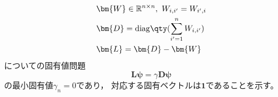 \documentclass[class=jsarticle, crop=false, dvipdfmx, fleqn]{standalone}
\begin{document}
\section{}

\begin{align}
    & \bm{W} \in \mathbb{R}^{n \times n},\ W_{i, i'} = W_{i', i}
    \label{eq:W} \\
    & \bm{D} = \mathrm{diag}\qty(\sum_{i'=1}^{n} W_{i, i'})
    \label{eq:D} \\
    & \bm{L} = \bm{D} - \bm{W}
    \label{eq:L}
\end{align}
についての固有値問題
\begin{equation}
    \bm{L} \bm{\psi} = \gamma \bm{D} \bm{\psi}
    \label{eq:eigen_problem}
\end{equation}
の最小固有値\(\gamma_n = 0\)であり，
対応する固有ベクトルは\(\bm{1}\)であることを示す。
\end{document}
